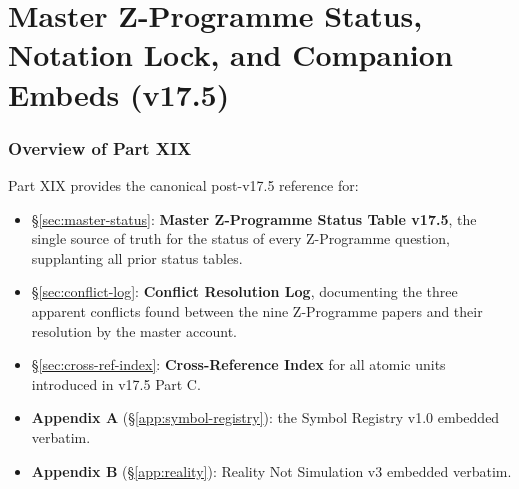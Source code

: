 \documentclass[12pt, a4paper]{article}
\begin{document}

\part{Master Z-Programme Status, Notation Lock, and Companion Embeds (v17.5)}
\label{part:XIX}

\section*{Overview of Part XIX}

Part XIX provides the canonical post-v17.5 reference for:
\begin{itemize}[leftmargin=2em]
\item \S\ref{sec:master-status}: \textbf{Master Z-Programme Status
Table v17.5}, the single source of truth for the status of every
Z-Programme question, supplanting all prior status tables.
\item \S\ref{sec:conflict-log}: \textbf{Conflict Resolution Log},
documenting the three apparent conflicts found between the nine
Z-Programme papers and their resolution by the master account.
\item \S\ref{sec:cross-ref-index}: \textbf{Cross-Reference Index} for
all atomic units introduced in v17.5 Part C.
\item \textbf{Appendix A} (\S\ref{app:symbol-registry}): the Symbol
Registry v1.0 embedded verbatim.
\item \textbf{Appendix B} (\S\ref{app:reality}): Reality Not Simulation
v3 embedded verbatim.
\end{itemize}
\end{document}
